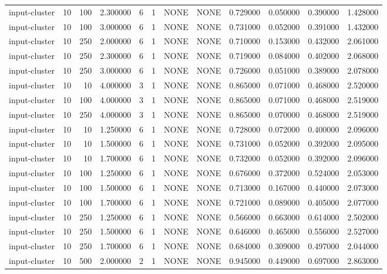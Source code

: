 \begin{tabular}{lrrrllllrrrr}
input-cluster & 10 & 100 & 2.300000 & 6 & 1 & NONE & NONE & 0.729000 & 0.050000 & 0.390000 & 1.428000 \\
input-cluster & 10 & 100 & 3.000000 & 6 & 1 & NONE & NONE & 0.731000 & 0.052000 & 0.391000 & 1.432000 \\
input-cluster & 10 & 250 & 2.000000 & 6 & 1 & NONE & NONE & 0.710000 & 0.153000 & 0.432000 & 2.061000 \\
input-cluster & 10 & 250 & 2.300000 & 6 & 1 & NONE & NONE & 0.719000 & 0.084000 & 0.402000 & 2.068000 \\
input-cluster & 10 & 250 & 3.000000 & 6 & 1 & NONE & NONE & 0.726000 & 0.051000 & 0.389000 & 2.078000 \\
input-cluster & 10 & 10 & 4.000000 & 3 & 1 & NONE & NONE & 0.865000 & 0.071000 & 0.468000 & 2.520000 \\
input-cluster & 10 & 100 & 4.000000 & 3 & 1 & NONE & NONE & 0.865000 & 0.071000 & 0.468000 & 2.519000 \\
input-cluster & 10 & 250 & 4.000000 & 3 & 1 & NONE & NONE & 0.865000 & 0.070000 & 0.468000 & 2.519000 \\
input-cluster & 10 & 10 & 1.250000 & 6 & 1 & NONE & NONE & 0.728000 & 0.072000 & 0.400000 & 2.096000 \\
input-cluster & 10 & 10 & 1.500000 & 6 & 1 & NONE & NONE & 0.731000 & 0.052000 & 0.392000 & 2.095000 \\
input-cluster & 10 & 10 & 1.700000 & 6 & 1 & NONE & NONE & 0.732000 & 0.052000 & 0.392000 & 2.096000 \\
input-cluster & 10 & 100 & 1.250000 & 6 & 1 & NONE & NONE & 0.676000 & 0.372000 & 0.524000 & 2.053000 \\
input-cluster & 10 & 100 & 1.500000 & 6 & 1 & NONE & NONE & 0.713000 & 0.167000 & 0.440000 & 2.073000 \\
input-cluster & 10 & 100 & 1.700000 & 6 & 1 & NONE & NONE & 0.721000 & 0.089000 & 0.405000 & 2.077000 \\
input-cluster & 10 & 250 & 1.250000 & 6 & 1 & NONE & NONE & 0.566000 & 0.663000 & 0.614000 & 2.502000 \\
input-cluster & 10 & 250 & 1.500000 & 6 & 1 & NONE & NONE & 0.646000 & 0.465000 & 0.556000 & 2.527000 \\
input-cluster & 10 & 250 & 1.700000 & 6 & 1 & NONE & NONE & 0.684000 & 0.309000 & 0.497000 & 2.044000 \\
input-cluster & 10 & 500 & 2.000000 & 2 & 1 & NONE & NONE & 0.945000 & 0.449000 & 0.697000 & 2.863000 \\

\end{tabular}
